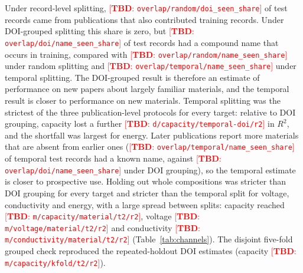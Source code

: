\documentclass[journal=jcisd8,manuscript=article,layout=traditional]{achemso}
\newcommand{\TBD}[1]{\textcolor{red}{[\textbf{TBD}: \nolinkurl{#1}]}}
\begin{document}
Under record-level splitting, \TBD{overlap/random/doi_seen_share} of test records came from publications that also contributed training records. Under DOI-grouped splitting this share is zero, but \TBD{overlap/doi/name_seen_share} of test records had a compound name that occurs in training, compared with \TBD{overlap/random/name_seen_share} under random splitting and \TBD{overlap/temporal/name_seen_share} under temporal splitting. The DOI-grouped result is therefore an estimate of performance on new papers about largely familiar materials, and the temporal result is closer to performance on new materials. Temporal splitting was the strictest of the three publication-level protocols for every target: relative to DOI grouping, capacity lost a further \TBD{d/capacity/temporal-doi/r2} in $R^2$, and the shortfall was largest for energy. Later publications report more materials that are absent from earlier ones (\TBD{overlap/temporal/name_seen_share} of temporal test records had a known name, against \TBD{overlap/doi/name_seen_share} under DOI grouping), so the temporal estimate is closer to prospective use. Holding out whole compositions was stricter than DOI grouping for every target and stricter than the temporal split for voltage, conductivity and energy, with a large spread between splits: capacity reached \TBD{m/capacity/material/t2/r2}, voltage \TBD{m/voltage/material/t2/r2} and conductivity \TBD{m/conductivity/material/t2/r2} (Table~\ref{tab:channels}). The disjoint five-fold grouped check reproduced the repeated-holdout DOI estimates (capacity \TBD{m/capacity/kfold/t2/r2}).
\end{document}
